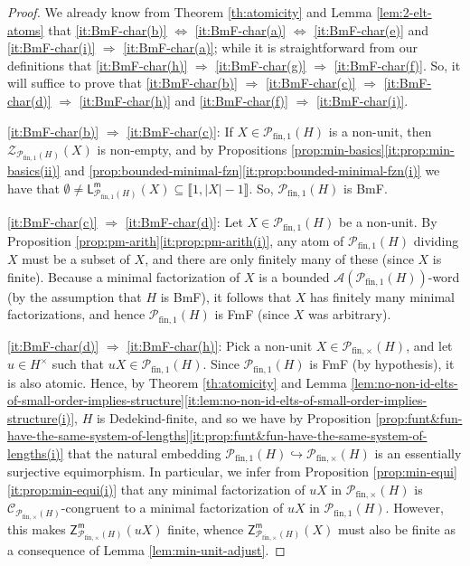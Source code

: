 \documentclass{report}
\newcommand{\llb}{\llbracket}
\newcommand{\rrb}{\rrbracket}
\newcommand{\fin}{\textrm{fin}}
\newcommand{\fun}{{\textrm{fin}, 1}}
\newcommand{\m}{{\mathsf{m}}}
\renewcommand{\:}{\text{:}}
\theoremstyle{definition}
\begin{document}
\begin{proof}
	We already know from Theorem \ref{th:atomicity} and Lemma \ref{lem:2-elt-atoms} that \ref{it:BmF-char(b)} $\Leftrightarrow$ \ref{it:BmF-char(a)} $\Leftrightarrow$ \ref{it:BmF-char(e)} and \ref{it:BmF-char(i)} $\Rightarrow$ \ref{it:BmF-char(a)}; while it is straightforward from our definitions that \ref{it:BmF-char(h)} $\Rightarrow$ \ref{it:BmF-char(g)} $\Rightarrow$ \ref{it:BmF-char(f)}. So, it will suffice to prove that \ref{it:BmF-char(b)}
	$\Rightarrow$ \ref{it:BmF-char(c)} $\Rightarrow$ \ref{it:BmF-char(d)} $\Rightarrow$ \ref{it:BmF-char(h)}
	and \ref{it:BmF-char(f)} $\Rightarrow$
	\ref{it:BmF-char(i)}.
	
	\ref{it:BmF-char(b)} $\Rightarrow$ \ref{it:BmF-char(c)}: If $X \in \mathcal P_\fun(H)$ is a non-unit, then $\mathcal{Z}_{\mathcal P_\fun(H)}(X)$ is non-empty, and by Propositions \ref{prop:min-basics}\ref{it:prop:min-basics(ii)} and \ref{prop:bounded-minimal-fzn}\ref{it:prop:bounded-minimal-fzn(i)} we have that $\emptyset \ne \mathsf{L}_{\mathcal P_\fun(H)}^\m(X) \subseteq \llb 1, |X|-1\rrb$. So, $\mathcal P_\fun(H)$ is BmF.
	
	\ref{it:BmF-char(c)} $\Rightarrow$ \ref{it:BmF-char(d)}: Let $X \in \mathcal P_\fun(H)$ be a non-unit. 
	By Proposition \ref{prop:pm-arith}\ref{it:prop:pm-arith(i)}, any atom of $\mathcal P_\fun(H)$ dividing $X$ must be a subset of $X$, and there are only finitely many of these (since $X$ is finite).
	Because a minimal factorization of $X$ is a bounded $\mathscr A(\mathcal P_\fun(H))$-word (by the assumption that $H$ is BmF), it follows that $X$ has finitely many minimal factorizations, and hence $\mathcal P_\fun(H)$ is FmF (since $X$ was arbitrary).
	
	\ref{it:BmF-char(d)} $\Rightarrow$ \ref{it:BmF-char(h)}: Pick a non-unit $X \in \mathcal P_{\fin,\times}(H)$, and let $u \in H^\times$ such that $uX \in \mathcal P_{\fin,1}(H)$. Since $\mathcal P_{\fin,1}(H)$ is FmF (by hypothesis), it is also atomic. Hence, by Theorem \ref{th:atomicity} and Lemma \ref{lem:no-non-id-elts-of-small-order-implies-structure}\ref{it:lem:no-non-id-elts-of-small-order-implies-structure(i)}, $H$ is Dedekind-finite, and so we have by Proposition \ref{prop:funt&fun-have-the-same-system-of-lengths}\ref{it:prop:funt&fun-have-the-same-system-of-lengths(i)} that the natural embedding $\mathcal P_{\fin,1}(H) \hookrightarrow \mathcal P_{\fin,\times}(H)$ is an essentially surjective equimorphism.  
	In particular, we infer from Proposition \ref{prop:min-equi}\ref{it:prop:min-equi(i)} that any minimal factorization of $uX$ in $\mathcal P_{\fin,\times}(H)$ is $\mathscr C_{\mathcal P_{\fin,\times}(H)}$-congruent to a minimal factorization of $uX$ in $\mathcal P_{\fin,1}(H)$.
	However, this makes $\mathsf{Z}_{\mathcal P_{\fin,\times}(H)}^\m(uX)$ finite, whence $\mathsf{Z}_{\mathcal P_{\fin,\times}(H)}^\m(X)$ must also be finite as a consequence of Lemma \ref{lem:min-unit-adjust}.
	

\end{proof}
\end{document}
